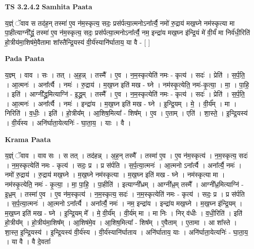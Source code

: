 \documentclass[17pt]{extarticle}
\begin{document}
\textbf{TS 3.2.4.2 } \newline
\textbf{Samhita Paata} \newline

य॒ज्ञ्ं ॅवाव स तद॑ह॒न् तस्मा॑ ए॒व न॑म॒स्कृत्य॒ सदः॒ प्रस॑र्पत्या॒त्मनोऽना᳚र्त्यै॒ नमो॑ रु॒द्राय॑ मख॒घ्ने नम॑स्कृत्या मा पा॒हीत्याग्नी᳚द्ध्रं॒ तस्मा॑ ए॒व न॑म॒स्कृत्य॒ सदः॒ प्रस॑र्पत्या॒त्मनोऽना᳚र्त्यै॒ नम॒ इन्द्रा॑य मख॒घ्न इ॑न्द्रि॒यं मे॑ वी॒र्यं॑ मा निर्व॑धी॒रिति॑ हो॒त्रीय॑मा॒शिष॑मे॒वैतामा शा᳚स्तैन्द्रि॒यस्य॑ वी॒र्य॑स्यानि॑र्घाताय॒ या वै - [  ] \newline

\textbf{Pada Paata} \newline

य॒ज्ञ्म् । वाव । सः । तत् । अ॒ह॒न्न् । तस्मै᳚ । ए॒व । न॒म॒स्कृत्येति॑ नमः - कृत्य॑ । सदः॑ । प्रेति॑ । स॒र्प॒ति॒ । आ॒त्मनः॑ । अना᳚र्त्यै । नमः॑ । रु॒द्राय॑ । म॒ख॒घ्न इति॑ मख - घ्ने । नम॑स्कृ॒त्येति॒ नमः॑-कृ॒त्या॒ । मा॒ । पा॒हि॒ । इति॑ । आग्नी᳚द्ध्र॒मित्याग्नि॑ - इ॒द्ध्र॒म् । तस्मै᳚ । ए॒व । न॒म॒स्कृत्येति॑ नमः - कृत्य॑ । सदः॑ । प्रेति॑ । स॒र्प॒ति॒ । आ॒त्मनः॑ । अना᳚र्त्यै । नमः॑ । इन्द्रा॑य । म॒ख॒घ्न इति॑ मख - घ्ने । इ॒न्द्रि॒यम् । मे॒ । वी॒र्य᳚म् । मा । निरिति॑ । व॒धीः॒ । इति॑ । हो॒त्रीय᳚म् । आ॒शिष॒मित्या᳚ - शिष᳚म् । ए॒व । ए॒ताम् । एति॑ । शा॒स्ते॒ । इ॒न्द्रि॒यस्य॑ । वी॒र्य॑स्य । अनि॑र्घाता॒येत्यनिः॑ - घा॒ता॒य॒ । याः । वै ।  \newline


\textbf{Krama Paata} \newline

य॒ज्ञ्ं ॅवाव । वाव सः । स तत् । तद॑हन्न् । अ॒ह॒न् तस्मै᳚ । तस्मा॑ ए॒व । ए॒व न॑म॒स्कृत्य॑ । न॒म॒स्कृत्य॒ सदः॑ । न॒म॒स्कृत्येति॑ नमः - कृत्य॑ । सदः॒ प्र । प्र स॑र्पति । स॒र्प॒त्या॒त्मनः॑ । आ॒त्मनो ऽना᳚र्त्यै । अना᳚र्त्यै॒ नमः॑ । नमो॑ रु॒द्राय॑ । रु॒द्राय॑ मख॒घ्ने । म॒ख॒घ्ने नम॑स्कृत्या । म॒ख॒घ्न इति॑ मख - घ्ने । नम॑स्कृत्या मा । नम॑स्कृ॒त्येति॒ नमः॑ - कृ॒त्या॒ । मा॒ पा॒हि॒ । पा॒हीति॑ । इत्याग्नी᳚ध्रम् । आग्नी᳚ध्र॒म् तस्मै᳚ । आग्नी᳚ध्र॒मित्याग्नि॑ - इ॒ध्र॒म् । तस्मा॑ ए॒व । ए॒व न॑म॒स्कृत्य॑ । न॒म॒स्कृत्य॒ सदः॑ । न॒म॒स्कृत्येति॑ नमः - कृत्य॑ । सदः॒ प्र । प्र स॑र्पति । स॒र्प॒त्या॒त्मनः॑ । आ॒त्मनो ऽना᳚र्त्यै । अना᳚र्त्यै॒ नमः॑ । नम॒ इन्द्रा॑य । इन्द्रा॑य मख॒घ्ने । म॒ख॒घ्न इ॑न्द्रि॒यम् । म॒ख॒घ्न इति॑ मख - घ्ने । इ॒न्द्रि॒यम् मे᳚ । मे॒ वी॒र्य᳚म् । वी॒र्य॑म् मा । मा निः । निर् व॑धीः । व॒धी॒रिति॑ । इति॑ हो॒त्रीय᳚म् । हो॒त्रीय॑मा॒शिष᳚म् । आ॒शिष॑मे॒व । आ॒शिष॒मित्या᳚ - शिष᳚म् । ए॒वैताम् । ए॒तामा । आ शा᳚स्ते । शा॒स्त॒ इ॒न्द्रि॒यस्य॑ । इ॒न्द्रि॒यस्य॑ वी॒र्य॑स्य । वी॒र्य॑स्यानि॑र्घाताय । अनि॑र्घाताय॒ याः । अनि॑र्घाता॒येत्यनिः॑ - घा॒ता॒य॒ । या वै । वै दे॒वताः᳚ \newline
\end{document}
